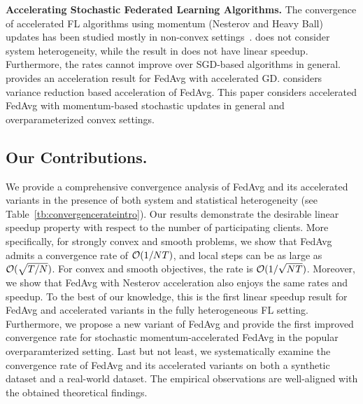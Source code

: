 \textbf{Accelerating Stochastic Federated Learning Algorithms.}
The convergence of accelerated FL algorithms using momentum (Nesterov and Heavy Ball) updates has been studied mostly in non-convex settings~\cite{yu2019linear,huo2020faster}. \cite{yu2019linear} does not consider system heterogeneity, while the result in \cite{huo2020faster} does not have linear speedup. Furthermore, the rates cannot improve over SGD-based algorithms in general. \cite{liu2019accelerating} provides an acceleration result for FedAvg with accelerated GD. \cite{liang2019variance} considers variance reduction based acceleration of FedAvg. This paper considers accelerated FedAvg with momentum-based stochastic updates in general and overparameterized convex settings.

\begin{comment}
	In this work, we provide a novel accelerated FedAvg with improved convergence rates under a popular overparameterized setting. 
\end{comment}




\subsection{Our Contributions.}
We provide a comprehensive convergence analysis
of FedAvg and its accelerated variants in the presence of both system and statistical heterogeneity (see Table~\ref{tb:convergencerateintro}).
Our results demonstrate the desirable linear speedup property with respect to the number of participating clients.
More specifically, for strongly convex and smooth problems, we show 
that FedAvg admits a convergence rate of 
{\small{${\mathcal{O}}(1/NT)$}}, and local steps can be as large as {\small{${\mathcal{O}}(\sqrt{T/N})$}}. For convex and smooth objectives, the rate is {\small{${\mathcal{O}}(1/\sqrt{NT})$}}. 
Moreover, we show that FedAvg with Nesterov acceleration also enjoys the same rates and speedup. 
To the best of our knowledge, this is the first linear speedup result for FedAvg and accelerated variants in the fully heterogeneous FL setting. Furthermore, 
we propose a new variant of FedAvg and provide the first improved convergence rate for stochastic momentum-accelerated FedAvg in the popular overparamterized setting.
Last but not least, we systematically examine the convergence rate of
FedAvg and its accelerated variants on both a synthetic dataset and  a real-world dataset. The empirical observations are well-aligned with the obtained theoretical findings.


